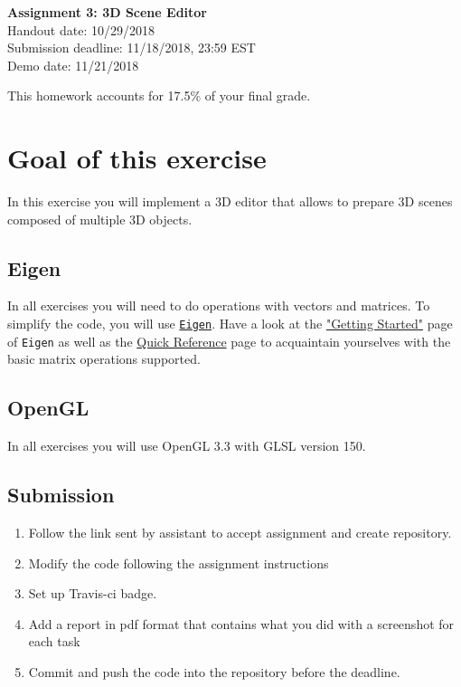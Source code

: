 \documentclass[11pt]{article}
\begin{document}
\hspace{50pt}

\begin{center}

{\Huge \textbf{Assignment 3: 3D Scene Editor}}\\
\vspace{10pt}
Handout date: 10/29/2018\\
Submission deadline: 11/18/2018,  23:59 EST\\
Demo date: 11/21/2018
\end{center}

\noindent This homework accounts for 17.5\% of your final grade. 

\section*{Goal of this exercise}
In this exercise you will implement a 3D editor that allows to prepare 3D scenes composed of multiple 3D objects.

\subsection*{Eigen}
In all exercises you will need to do operations with vectors and matrices. To simplify the code, you will use \href{http://eigen.tuxfamily.org/}{\texttt{Eigen}}. 
Have a look at the \href{http://eigen.tuxfamily.org/dox/GettingStarted.html}{"Getting Started"} page of \texttt{Eigen} as well as the \href{http://eigen.tuxfamily.org/dox/group__QuickRefPage.html}{Quick Reference} page to acquaintain yourselves with the basic matrix operations supported. 

\subsection*{OpenGL}
In all exercises you will use OpenGL 3.3 with GLSL version 150.

\subsection*{Submission}

\begin{enumerate}
\item Follow the link sent by assistant to accept assignment and create repository.
\item Modify the code following the assignment instructions
\item Set up Travis-ci badge.
\item Add a report in pdf format that contains what you did with a screenshot for each task
\item Commit and push the code into the repository before the deadline.
\end{enumerate}
\end{document}
